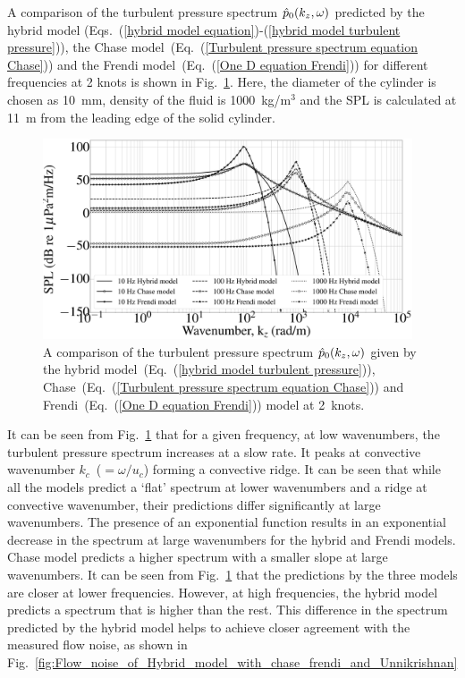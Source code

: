\documentclass[11pt,cleanfoot]{asme2ej}
\begin{document}
A comparison of the turbulent pressure spectrum $\Hat{p}_0(k_z,\omega)$ predicted by the hybrid model (Eqs.~(\ref{hybrid model equation})-(\ref{hybrid model turbulent pressure})), the Chase model~(Eq.~(\ref{Turbulent pressure spectrum equation Chase})) and the Frendi model~(Eq.~(\ref{One D equation Frendi})) for different frequencies at 2 knots is shown in Fig.~\ref{pressure comparison of hybrid model with chase and Frendi}. Here, the diameter of the cylinder is chosen as 10~mm, density of the fluid is 1000~kg/m$^3$ and the SPL is calculated at 11~m from the leading edge of the solid cylinder. 
\begin{figure}
    \centerline{
    \includegraphics[width=4.3in]{Chase_hybrid_Frendi_outside_pressure_Spectrum.eps}}
    \caption{A comparison of the turbulent pressure spectrum $\Hat{p}_0(k_z,\omega)$ given by the hybrid model~(Eq.~(\ref{hybrid model turbulent pressure})), Chase~(Eq.~(\ref{Turbulent pressure spectrum equation Chase})) and Frendi~(Eq.~(\ref{One D equation Frendi})) model at 2~knots.}
    \label{pressure comparison of hybrid model with chase and Frendi}
\end{figure}
It can be seen from Fig.~\ref{pressure comparison of hybrid model with chase and Frendi} that for a given frequency, at low wavenumbers, the turbulent pressure spectrum increases at a slow rate. It peaks at convective wavenumber $k_c$~($=\omega/u_c$) forming a convective ridge. It can be seen that while all the models predict a `flat' spectrum at lower wavenumbers and a ridge at convective wavenumber, their predictions differ significantly at large wavenumbers. The presence of an exponential function results in an exponential decrease in the spectrum at large wavenumbers for the hybrid and Frendi models. Chase model predicts a higher spectrum with a smaller slope at large wavenumbers. It can be seen from Fig.~\ref{pressure comparison of hybrid model with chase and Frendi} that the predictions by the three models are closer at lower frequencies. However, at high frequencies, the hybrid model predicts a spectrum that is higher than the rest. This difference in the spectrum predicted by the hybrid model helps to achieve closer agreement with the measured flow noise, as shown in Fig.~\ref{fig:Flow_noise_of_Hybrid_model_with_chase_frendi_and_Unnikrishnan}
\end{document}
